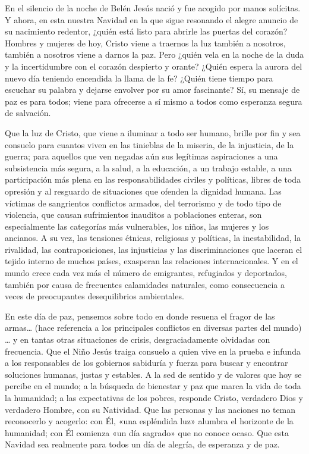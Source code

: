 \documentclass[]{article}
\begin{document}
En el silencio de la noche de Belén Jesús nació y fue acogido por manos
solícitas. Y ahora, en esta nuestra Navidad en la que sigue resonando el
alegre anuncio de su nacimiento redentor, ¿quién está listo para abrirle
las puertas del corazón? Hombres y mujeres de hoy, Cristo viene a
traernos la luz también a nosotros, también a nosotros viene a darnos la
paz. Pero ¿quién vela en la noche de la duda y la incertidumbre con el
corazón despierto y orante? ¿Quién espera la aurora del nuevo día
teniendo encendida la llama de la fe? ¿Quién tiene tiempo para escuchar
su palabra y dejarse envolver por su amor fascinante? Sí, su mensaje de
paz es para todos; viene para ofrecerse a sí mismo a todos como
esperanza segura de salvación.

Que la luz de Cristo, que viene a iluminar a todo ser humano, brille por
fin y sea consuelo para cuantos viven en las tinieblas de la miseria, de
la injusticia, de la guerra; para aquellos que ven negadas aún sus
legítimas aspiraciones a una subsistencia más segura, a la salud, a la
educación, a un trabajo estable, a una participación más plena en las
responsabilidades civiles y políticas, libres de toda opresión y al
resguardo de situaciones que ofenden la dignidad humana. Las víctimas de
sangrientos conflictos armados, del terrorismo y de todo tipo de
violencia, que causan sufrimientos inauditos a poblaciones enteras, son
especialmente las categorías más vulnerables, los niños, las mujeres y
los ancianos. A su vez, las tensiones étnicas, religiosas y políticas,
la inestabilidad, la rivalidad, las contraposiciones, las injusticias y
las discriminaciones que laceran el tejido interno de muchos países,
exasperan las relaciones internacionales. Y en el mundo crece cada vez
más el número de emigrantes, refugiados y deportados, también por causa
de frecuentes calamidades naturales, como consecuencia a veces de
preocupantes desequilibrios ambientales.

En este día de paz, pensemos sobre todo en donde resuena el fragor de
las armas\ldots{} (hace referencia a los principales conflictos en
diversas partes del mundo) \ldots{} y en tantas otras situaciones de
crisis, desgraciadamente olvidadas con frecuencia. Que el Niño Jesús
traiga consuelo a quien vive en la prueba e infunda a los responsables
de los gobiernos sabiduría y fuerza para buscar y encontrar soluciones
humanas, justas y estables. A la sed de sentido y de valores que hoy se
percibe en el mundo; a la búsqueda de bienestar y paz que marca la vida
de toda la humanidad; a las expectativas de los pobres, responde Cristo,
verdadero Dios y verdadero Hombre, con su Natividad. Que las personas y
las naciones no teman reconocerlo y acogerlo: con Él, «una espléndida
luz» alumbra el horizonte de la humanidad; con Él comienza «un día
sagrado» que no conoce ocaso. Que esta Navidad sea realmente para todos
un día de alegría, de esperanza y de paz.
\end{document}
